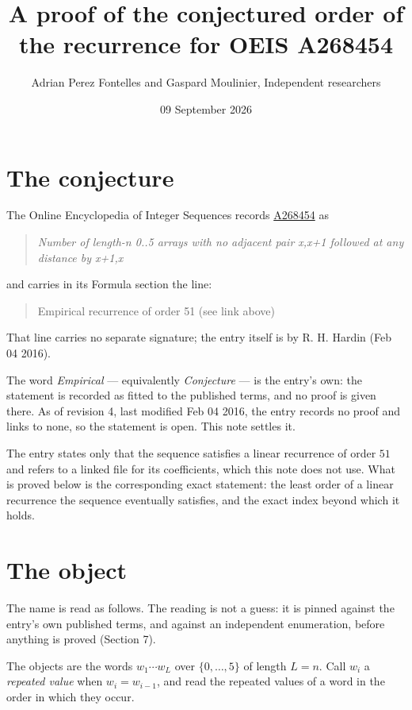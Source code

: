 \documentclass[11pt]{article}
\title{A proof of the conjectured order of the recurrence for OEIS A268454}
\author{Adrian Perez Fontelles and Gaspard Moulinier, Independent researchers}
\date{09 September 2026}
\theoremstyle{definition}
\begin{document}
\maketitle
\section{The conjecture}

The Online Encyclopedia of Integer Sequences records \href{https://oeis.org/A268454}{A268454} as

\begin{quote}\itshape Number of length-n 0..5 arrays with no adjacent pair x,x+1 followed at any distance by x+1,x\end{quote}

and carries in its Formula section the line:

\begin{quote}\ttfamily Empirical recurrence of order 51 (see link above)\end{quote}

That line carries no separate signature; the entry itself is by R. H. Hardin (Feb 04 2016).

The word {\itshape Empirical} --- equivalently {\itshape Conjecture} --- is the entry's own: the statement is recorded as fitted to the published terms, and no proof is given there. As of revision 4, last modified Feb 04 2016, the entry records no proof and links to none, so the statement is open. This note settles it.

The entry states only that the sequence satisfies a linear recurrence of order $51$ and refers to a linked file for its coefficients, which this note does not use. What is proved below is the corresponding exact statement: the least order of a linear recurrence the sequence eventually satisfies, and the exact index beyond which it holds.

\section{The object}

The name is read as follows. The reading is not a guess: it is pinned against the entry's own published terms, and against an independent enumeration, before anything is proved (Section 7).

The objects are the words $w_1\cdots w_L$ over $\{0,\dots,5\}$ of length $L = n$. Call $w_i$ a {\itshape repeated value} when $w_i = w_{i-1}$, and read the repeated values of a word in the order in which they occur.
\end{document}
